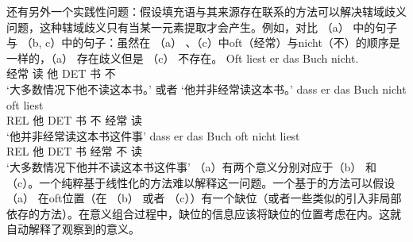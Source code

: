 还有另外一个实践性问题：假设填充语与其来源存在联系的方法可以解决辖域歧义问题，这种辖域歧义只有当某一元素提取才会产生。例如，对比 （a） 中的句子与 （b, c）中的句子：虽然在 （a） 、（c）中oft（经常）与nicht（不）的顺序是一样的，（a） 存在歧义但是 （c） 不存在。
\eal
\ex 
\gll Oft liest er das Buch nicht.\\
     经常 读 他 DET 书 不\\
\glt `大多数情况下他不读这本书。' 或者 `他并非经常读这本书。'
\ex
\gll dass er das Buch nicht oft liest\\
     REL 他 DET 书 不 经常 读\\
\glt `他并非经常读这本书这件事'
\ex
\gll dass er das Buch oft nicht liest\\
     REL 他 DET 书 经常 不 读\\
\glt `大多数情况下他并不读这本书这件事'
\zl
（a）有两个意义分别对应于（b） 和 （c）。一个纯粹基于线性化的方法难以解释这一问题。一个基于\slaschc 的方法可以假设 （a） 在oft位置（在 （b） 或者 （c））有一个缺位（或者一些类似的引入非局部依存的方法）。在意义组合过程中，缺位的信息应该将缺位的位置考虑在内。这就自动解释了观察到的意义。

